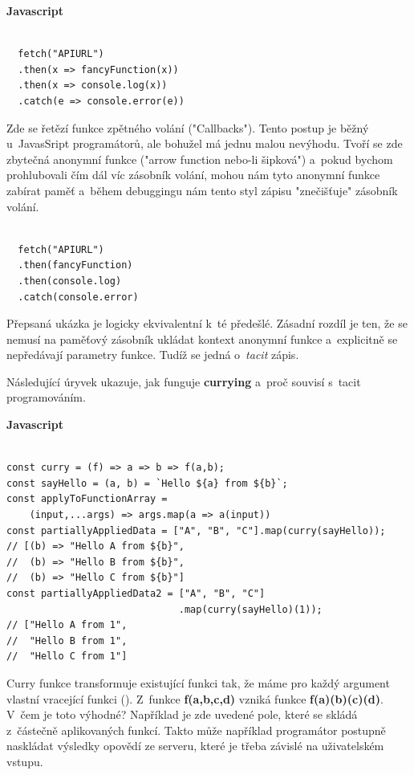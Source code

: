 \documentclass[male, czech]{kithesis}
\begin{document}
\textbf{Javascript}
\begin{verbatim}

  fetch("APIURL")
  .then(x => fancyFunction(x))
  .then(x => console.log(x))
  .catch(e => console.error(e))

\end{verbatim}

Zde se řetězí funkce zpětného volání ("Callbacks"). 
Tento postup je běžný u~JavasSript programátorů,
ale bohužel má jednu malou nevýhodu.
Tvoří se zde zbytečná anonymní funkce ("arrow function nebo-li šipková") 
a~pokud bychom prohlubovali čím dál víc zásobník volání,
mohou nám tyto anonymní funkce zabírat paměť
a~během debuggingu nám tento styl zápisu "znečišťuje" 
zásobník volání. 

\begin{verbatim}

  fetch("APIURL")
  .then(fancyFunction)
  .then(console.log)
  .catch(console.error)

\end{verbatim}

Přepsaná ukázka je logicky ekvivalentní k~té předešlé. 
Zásadní rozdíl je ten, 
že se nemusí na paměťový zásobník ukládat kontext anonymní funkce 
a~explicitně se nepředávají parametry funkce. 
Tudíž se jedná o~\textit{tacit} zápis.

Následující úryvek ukazuje, 
jak funguje \textbf{currying} a~proč souvisí s~tacit programováním.

\textbf{Javascript}
\begin{verbatim}

const curry = (f) => a => b => f(a,b);
const sayHello = (a, b) = `Hello ${a} from ${b}`;
const applyToFunctionArray = 
    (input,...args) => args.map(a => a(input))
const partiallyAppliedData = ["A", "B", "C"].map(curry(sayHello)); 
// [(b) => "Hello A from ${b}", 
//  (b) => "Hello B from ${b}", 
//  (b) => "Hello C from ${b}"]
const partiallyAppliedData2 = ["A", "B", "C"]
                              .map(curry(sayHello)(1)); 
// ["Hello A from 1", 
//  "Hello B from 1", 
//  "Hello C from 1"]

\end{verbatim}
Curry funkce transformuje existující funkci tak, 
že máme pro každý argument vlastní vracející funkci  (\cite{Currying}). 
Z~funkce \textbf{f(a,b,c,d)} vzniká funkce \textbf{f(a)(b)(c)(d)}.
V~čem je toto výhodné?
Například je zde uvedené pole, 
které se skládá z~částečně aplikovaných funkcí. 
Takto může například programátor postupně naskládat výsledky opovědí ze serveru,
které je třeba závislé na uživatelském vstupu. 
\end{document}
